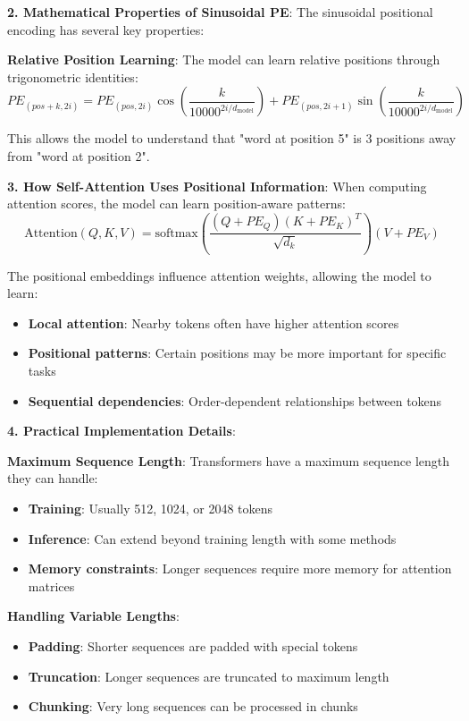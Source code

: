 \textbf{2. Mathematical Properties of Sinusoidal PE}:
The sinusoidal positional encoding has several key properties:

\textbf{Relative Position Learning}:
The model can learn relative positions through trigonometric identities:
\[
	PE_{(pos+k, 2i)} = PE_{(pos, 2i)} \cos\left(\frac{k}{10000^{2i/d_{\text{model}}}}\right) + PE_{(pos, 2i+1)} \sin\left(\frac{k}{10000^{2i/d_{\text{model}}}}\right)
\]

This allows the model to understand that "word at position 5" is 3 positions away from "word at position 2".

\textbf{3. How Self-Attention Uses Positional Information}:
When computing attention scores, the model can learn position-aware patterns:
\[
	\text{Attention}(Q, K, V) = \text{softmax}\left(\frac{(Q + PE_Q)(K + PE_K)^T}{\sqrt{d_k}}\right)(V + PE_V)
\]

The positional embeddings influence attention weights, allowing the model to learn:
\begin{itemize}
	\item \textbf{Local attention}: Nearby tokens often have higher attention scores
	\item \textbf{Positional patterns}: Certain positions may be more important for specific tasks
	\item \textbf{Sequential dependencies}: Order-dependent relationships between tokens
\end{itemize}

\textbf{4. Practical Implementation Details}:

\textbf{Maximum Sequence Length}:
Transformers have a maximum sequence length they can handle:
\begin{itemize}
	\item \textbf{Training}: Usually 512, 1024, or 2048 tokens
	\item \textbf{Inference}: Can extend beyond training length with some methods
	\item \textbf{Memory constraints}: Longer sequences require more memory for attention matrices
\end{itemize}

\textbf{Handling Variable Lengths}:
\begin{itemize}
	\item \textbf{Padding}: Shorter sequences are padded with special tokens
	\item \textbf{Truncation}: Longer sequences are truncated to maximum length
	\item \textbf{Chunking}: Very long sequences can be processed in chunks
\end{itemize}


